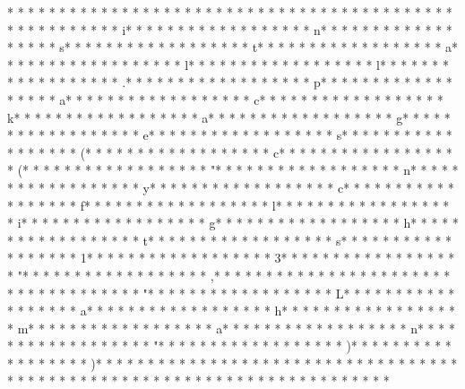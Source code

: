 * * *  * * *  * * *  *  * * *  *  * * *  * 	* * *  * * *  * * *  *  * * *  *  * * *  * 	* * *  * * *  * * *  *  * * *  *  * * *  * i* * *  * * *  * * *  *  * * *  *  * * *  * n* * *  * * *  * * *  *  * * *  *  * * *  * s* * *  * * *  * * *  *  * * *  *  * * *  * t* * *  * * *  * * *  *  * * *  *  * * *  * a* * *  * * *  * * *  *  * * *  *  * * *  * l* * *  * * *  * * *  *  * * *  *  * * *  * l* * *  * * *  * * *  *  * * *  *  * * *  * .* * *  * * *  * * *  *  * * *  *  * * *  * p* * *  * * *  * * *  *  * * *  *  * * *  * a* * *  * * *  * * *  *  * * *  *  * * *  * c* * *  * * *  * * *  *  * * *  *  * * *  * k* * *  * * *  * * *  *  * * *  *  * * *  * a* * *  * * *  * * *  *  * * *  *  * * *  * g* * *  * * *  * * *  *  * * *  *  * * *  * e* * *  * * *  * * *  *  * * *  *  * * *  * s* * *  * * *  * * *  *  * * *  *  * * *  * (* * *  * * *  * * *  *  * * *  *  * * *  * c* * *  * * *  * * *  *  * * *  *  * * *  * (* * *  * * *  * * *  *  * * *  *  * * *  * "* * *  * * *  * * *  *  * * *  *  * * *  * n* * *  * * *  * * *  *  * * *  *  * * *  * y* * *  * * *  * * *  *  * * *  *  * * *  * c* * *  * * *  * * *  *  * * *  *  * * *  * f* * *  * * *  * * *  *  * * *  *  * * *  * l* * *  * * *  * * *  *  * * *  *  * * *  * i* * *  * * *  * * *  *  * * *  *  * * *  * g* * *  * * *  * * *  *  * * *  *  * * *  * h* * *  * * *  * * *  *  * * *  *  * * *  * t* * *  * * *  * * *  *  * * *  *  * * *  * s* * *  * * *  * * *  *  * * *  *  * * *  * 1* * *  * * *  * * *  *  * * *  *  * * *  * 3* * *  * * *  * * *  *  * * *  *  * * *  * "* * *  * * *  * * *  *  * * *  *  * * *  * ,* * *  * * *  * * *  *  * * *  *  * * *  *  * * *  * * *  * * *  *  * * *  *  * * *  * "* * *  * * *  * * *  *  * * *  *  * * *  * L* * *  * * *  * * *  *  * * *  *  * * *  * a* * *  * * *  * * *  *  * * *  *  * * *  * h* * *  * * *  * * *  *  * * *  *  * * *  * m* * *  * * *  * * *  *  * * *  *  * * *  * a* * *  * * *  * * *  *  * * *  *  * * *  * n* * *  * * *  * * *  *  * * *  *  * * *  * "* * *  * * *  * * *  *  * * *  *  * * *  * )* * *  * * *  * * *  *  * * *  *  * * *  * )* * *  * * *  * * *  *  * * *  *  * * *  * 
* * *  * * *  * * *  *  * * *  *  * * *  * 	* * *  * * *  * * *  *  * * *  *  * * *  * 	* * *  * * *  * * *  *  * * *  *  * * *  * 
